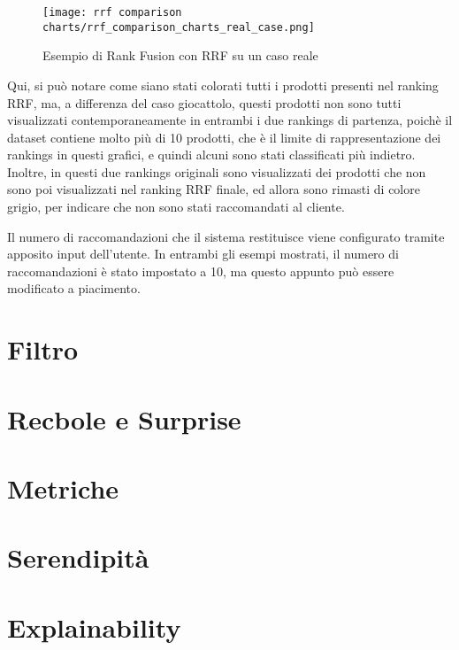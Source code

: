 \begin{figure}[h]
    \centering
    \texttt{[image: rrf comparison charts/rrf\_comparison\_charts\_real\_case.png]}
    \caption{Esempio di Rank Fusion con RRF su un caso reale}
    \label{fig:rank-fusion-real-case}
\end{figure}

Qui, si può notare come siano stati colorati tutti i prodotti presenti nel ranking RRF, ma, a differenza del caso giocattolo, questi prodotti non sono tutti visualizzati contemporaneamente in entrambi i due rankings di partenza, poichè il dataset contiene molto più di 10 prodotti, che è il limite di rappresentazione dei rankings in questi grafici, e quindi alcuni sono stati classificati più indietro. Inoltre, in questi due rankings originali sono visualizzati dei prodotti che non sono poi visualizzati nel ranking RRF finale, ed allora sono rimasti di colore grigio, per indicare che non sono stati raccomandati al cliente.

Il numero di raccomandazioni che il sistema restituisce viene configurato tramite apposito input dell'utente. In entrambi gli esempi mostrati, il numero di raccomandazioni è stato impostato a 10, ma questo appunto può essere modificato a piacimento.


\section{Filtro}

\section{Recbole e Surprise}

\section{Metriche}

\section{Serendipità}

\section{Explainability}
